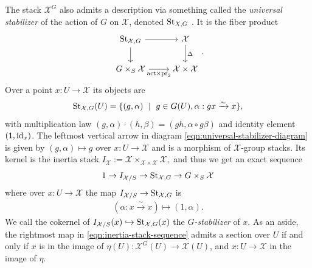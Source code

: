 \documentclass[12pt,dvipsnames]{amsart}
\begin{document}
The stack \(\mathcal X^G\) also admits a description via something called the \emph{universal stabilizer} of the action of $G$ on $\mathcal X$, denoted \(\operatorname{St}_{X,G}\) \cite[Section 4.1]{romagny_AlgebraicitySmoothnessFixed2022}. It is the fiber product
\begin{equation}\label{eqn:universal-stabilizer-diagram}
\begin{tikzcd}
  \St_{\mathcal X,G} \arrow[d]\arrow[r]& \mathcal X \arrow[d,"\Delta"] \\
  G\times_S \mathcal X\arrow[r,swap,"\text{act}\times \pr_2"]&\mathcal X\times \mathcal X
\end{tikzcd}.
\end{equation}
Over a point \(x:U\to \mathcal X\) its objects are
\begin{align*}
  \operatorname{St}_{\mathcal X,G}(U) = \{(g,\alpha) ~\mid~ g\in G(U), \alpha:gx\xrightarrow{\sim} x\},
\end{align*}
with multiplication law \((g,\alpha) \cdot (h,\beta) = (gh, \alpha \circ g\beta)\) and identity element \((1,\operatorname{id}_x)\). The leftmost vertical arrow in diagram \eqref{eqn:universal-stabilizer-diagram} is given by \((g,\alpha) \mapsto g\) over \(x:U\to \mathcal X\) and is a morphism of \(\mathcal X\)-group stacks. Its kernel is the inertia stack \(I_{\mathcal X} := \mathcal X\times_{\mathcal X\times \mathcal X}\mathcal X,\) and thus we get an exact sequence
\begin{equation}
  \label{eqn:inertia-stack-sequence}
  1 \to I_{\mathcal X/S} \to \operatorname{St}_{\mathcal X,G} \to G\times_S \mathcal X
\end{equation}
where over \(x:U\to \mathcal X\) the map \(I_{\mathcal X/S}\to \operatorname{St}_{\mathcal X, G}\) is
\begin{align*}
  (\alpha:x\xrightarrow{\sim} x) \mapsto (1, \alpha).
\end{align*}
We call the cokernel of \(I_{\mathcal X/S}(x)\hookrightarrow \operatorname{St}_{\mathcal X, G}(x)\) the \emph{\(G\)-stabilizer} of \(x\). As an aside, the rightmost map in \eqref{eqn:inertia-stack-sequence} admits a section over \(U\) if and only if \(x\) is in the image of \(\eta(U):\mathcal X^G(U)\to \mathcal X(U)\), and \(x:U\to \mathcal X\) in the image of \(\eta\).
\begin{remark}\label{rl-000A}
\end{remark}
\end{document}
